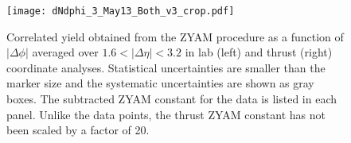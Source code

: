 \documentclass[aps,prl,twocolumn,superscriptaddress,groupedaddress]{revtex4}  %
\begin{document}

\begin{figure}[tb]
\begin{center}
\texttt{[image: dNdphi\_3\_May13\_Both\_v3\_crop.pdf]}
\caption{Correlated yield obtained from the ZYAM procedure as a function of $|\Delta\phi |$ averaged over $1.6 < |\Delta\eta| < 3.2$ in lab (left) and thrust (right) coordinate analyses. Statistical
uncertainties are smaller than the marker size and the systematic uncertainties are shown as gray boxes. The subtracted ZYAM constant for the data is listed in each panel.  Unlike the data points, the thrust ZYAM constant has not been scaled by a factor of 20.}
\label{fig:dNdphi} 
\end{center}
\end{figure}
\end{document}
